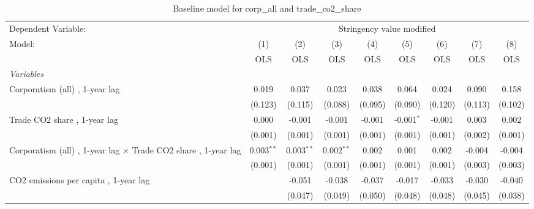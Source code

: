 
\begin{table}[htbp]
   \caption{Baseline model for corp\_all and trade\_co2\_share}
   \centering
   \begin{tabular}{lcccccccc}
      \toprule
      Dependent Variable: & \multicolumn{8}{c}{Stringency value modified}\\
      Model:                                                                & (1)          & (2)          & (3)          & (4)     & (5)          & (6)           & (7)           & (8)\\  
                                                                            &  OLS         & OLS          & OLS          & OLS     & OLS          & OLS           & OLS           & OLS\\  
      \midrule
      \emph{Variables}\\
      Corporatism (all) , 1-year lag                                        & 0.019        & 0.037        & 0.023        & 0.038   & 0.064        & 0.024         & 0.090         & 0.158\\   
                                                                            & (0.123)      & (0.115)      & (0.088)      & (0.095) & (0.090)      & (0.120)       & (0.113)       & (0.102)\\   
      Trade CO2 share , 1-year lag                                          & 0.000        & -0.001       & -0.001       & -0.001  & -0.001$^{*}$ & -0.001        & 0.003         & 0.002\\   
                                                                            & (0.001)      & (0.001)      & (0.001)      & (0.001) & (0.001)      & (0.001)       & (0.002)       & (0.001)\\   
      Corporatism (all) , 1-year lag $\times$ Trade CO2 share , 1-year lag  & 0.003$^{**}$ & 0.003$^{**}$ & 0.002$^{**}$ & 0.002   & 0.001        & 0.002         & -0.004        & -0.004\\   
                                                                            & (0.001)      & (0.001)      & (0.001)      & (0.001) & (0.001)      & (0.001)       & (0.003)       & (0.003)\\   
      CO2 emissions per capita , 1-year lag                                 &              & -0.051       & -0.038       & -0.037  & -0.017       & -0.033        & -0.030        & -0.040\\   
                                                                            &              & (0.047)      & (0.049)      & (0.050) & (0.048)      & (0.048)       & (0.045)       & (0.038)\\   

\end{tabular}
\end{table}
